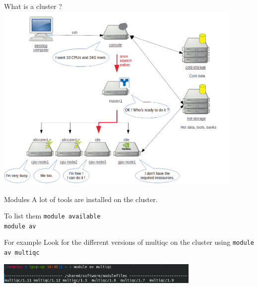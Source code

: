 \documentclass{beamer}
\begin{document}
\begin{frame}{What is a cluster ?}
\centering
\includegraphics[keepaspectratio=True, width =0.9\textwidth]{Images/slurm_submit.png}
\end{frame}

\begin{frame}[fragile]{Modules}
A lot of tools are installed on the cluster.
\\

\begin{block}{To list them}
    \verb|module available| \\
    \verb|module av|
\end{block}

 
\begin{block}{For example}
    Look for the different versions of multiqc on the cluster using \verb|module av multiqc|
\end{block}
\begin{center}
    \includegraphics[height = 1cm]{Images/multiqc.png}
\end{center}
\end{frame}
\end{document}
